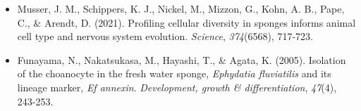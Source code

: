 \documentclass[10pt]{report}
\begin{document}
\begin{enumerate}
\begin{itemize}
			\item Musser, J. M., Schippers, K. J., Nickel, M., Mizzon, G., Kohn, A. B., Pape, C., \& Arendt, D. (2021). Profiling cellular diversity in sponges informs animal cell type and nervous system evolution. \textit{Science}, \textit{374}(6568), 717-723. 
			\item Funayama, N., Nakatsukasa, M., Hayashi, T., \& Agata, K. (2005). Isolation of the choanocyte in the fresh water sponge, \textit{Ephydatia fluviatilis} and its lineage marker, \textit{Ef annexin}. \textit{Development, growth \& differentiation}, \textit{47}(4), 243-253. 
		\end{itemize}
\end{enumerate}

\clearpage
\end{document}
